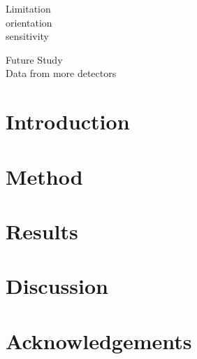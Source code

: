 \documentclass[twocolumn]{aastex631}
\begin{document}
Limitation\\
orientation\\
sensitivity

Future Study\\
Data from more detectors

\section{Introduction}



\section{Method}



\section{Results}



\section{Discussion}



\section{Acknowledgements}




\end{document}
